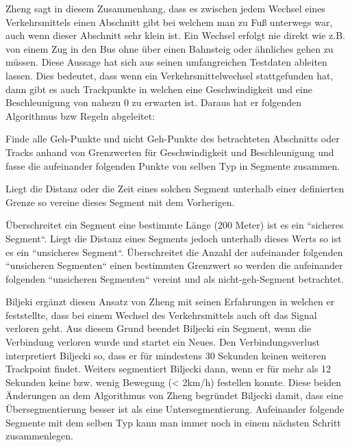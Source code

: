 Zheng sagt in diesem Zusammenhang, dass es zwischen jedem Wechsel eines Verkehrsmittels einen Abschnitt gibt bei welchem man zu Fuß unterwegs war, auch wenn dieser Abschnitt sehr klein ist. Ein Wechsel erfolgt nie direkt wie z.B. von einem Zug in den Bus ohne über einen Bahnsteig oder ähnliches gehen zu müssen. Diese Aussage hat sich aus seinen umfangreichen Testdaten ableiten lassen. Dies bedeutet, dass wenn ein Verkehrsmittelwechsel stattgefunden hat, dann gibt es auch Trackpunkte in welchen eine Geschwindigkeit und eine Beschleunigung von nahezu 0 zu erwarten ist. Daraus hat er folgenden Algorithmus bzw Regeln abgeleitet:  \cite{zheng_understanding_2010}

\begin{pitemize}
\item Finde alle Geh-Punkte und nicht Geh-Punkte des betrachteten Abschnitts oder Tracks anhand von Grenzwerten für Geschwindigkeit und Beschleunigung und fasse die aufeinander folgenden Punkte von selben Typ in Segmente zusammen.
\item Liegt die Distanz oder die Zeit eines solchen Segment unterhalb einer definierten Grenze so vereine dieses Segment mit dem Vorherigen.
\item Überschreitet ein Segment eine bestimmte Länge (200 Meter) ist es ein ``sicheres Segment``. Liegt die Distanz eines Segments jedoch unterhalb dieses Werts so ist es ein ``unsicheres Segment``. Überschreitet die Anzahl der aufeinander folgenden ``unsicheren Segmenten`` einen bestimmten Grenzwert so werden die  aufeinander folgenden ``unsicheren Segmenten`` vereint und als nicht-geh-Segment betrachtet.
\end{pitemize}

Biljeki ergänzt diesen Ansatz von Zheng mit seinen Erfahrungen in welchen er feststellte, dass bei einem Wechsel des Verkehrsmittels auch oft das Signal verloren geht. Aus diesem Grund beendet Biljecki ein Segment, wenn die Verbindung verloren wurde und startet ein Neues. Den Verbindungsverlust interpretiert Biljecki so, dass er für mindestens 30 Sekunden keinen weiteren Trackpoint findet. Weiters segmentiert Biljecki dann, wenn er für mehr als 12 Sekunden keine bzw. wenig Bewegung (< 2km/h) festellen konnte. Diese beiden Änderungen an dem Algorithmus von Zheng begründet Biljecki damit, dass eine Übersegmentierung besser ist als eine Untersegmentierung. Aufeinander folgende Segmente mit dem selben Typ kann man immer noch in einem nächsten Schritt zusammenlegen. \cite{biljecki_transportation_2013}

